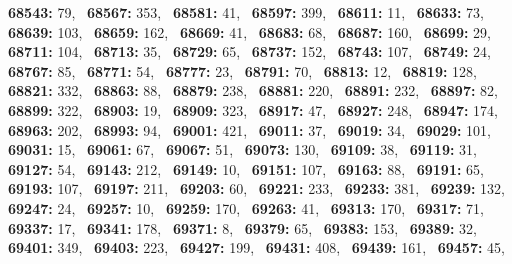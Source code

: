 \textbf{68543:} 79,\allowbreak~ 
\textbf{68567:} 353,\allowbreak~ 
\textbf{68581:} 41,\allowbreak~ 
\textbf{68597:} 399,\allowbreak~ 
\textbf{68611:} 11,\allowbreak~ 
\textbf{68633:} 73,\allowbreak~ 
\textbf{68639:} 103,\allowbreak~ 
\textbf{68659:} 162,\allowbreak~ 
\textbf{68669:} 41,\allowbreak~ 
\textbf{68683:} 68,\allowbreak~ 
\textbf{68687:} 160,\allowbreak~ 
\textbf{68699:} 29,\allowbreak~ 
\textbf{68711:} 104,\allowbreak~ 
\textbf{68713:} 35,\allowbreak~ 
\textbf{68729:} 65,\allowbreak~ 
\textbf{68737:} 152,\allowbreak~ 
\textbf{68743:} 107,\allowbreak~ 
\textbf{68749:} 24,\allowbreak~ 
\textbf{68767:} 85,\allowbreak~ 
\textbf{68771:} 54,\allowbreak~ 
\textbf{68777:} 23,\allowbreak~ 
\textbf{68791:} 70,\allowbreak~ 
\textbf{68813:} 12,\allowbreak~ 
\textbf{68819:} 128,\allowbreak~ 
\textbf{68821:} 332,\allowbreak~ 
\textbf{68863:} 88,\allowbreak~ 
\textbf{68879:} 238,\allowbreak~ 
\textbf{68881:} 220,\allowbreak~ 
\textbf{68891:} 232,\allowbreak~ 
\textbf{68897:} 82,\allowbreak~ 
\textbf{68899:} 322,\allowbreak~ 
\textbf{68903:} 19,\allowbreak~ 
\textbf{68909:} 323,\allowbreak~ 
\textbf{68917:} 47,\allowbreak~ 
\textbf{68927:} 248,\allowbreak~ 
\textbf{68947:} 174,\allowbreak~ 
\textbf{68963:} 202,\allowbreak~ 
\textbf{68993:} 94,\allowbreak~ 
\textbf{69001:} 421,\allowbreak~ 
\textbf{69011:} 37,\allowbreak~ 
\textbf{69019:} 34,\allowbreak~ 
\textbf{69029:} 101,\allowbreak~ 
\textbf{69031:} 15,\allowbreak~ 
\textbf{69061:} 67,\allowbreak~ 
\textbf{69067:} 51,\allowbreak~ 
\textbf{69073:} 130,\allowbreak~ 
\textbf{69109:} 38,\allowbreak~ 
\textbf{69119:} 31,\allowbreak~ 
\textbf{69127:} 54,\allowbreak~ 
\textbf{69143:} 212,\allowbreak~ 
\textbf{69149:} 10,\allowbreak~ 
\textbf{69151:} 107,\allowbreak~ 
\textbf{69163:} 88,\allowbreak~ 
\textbf{69191:} 65,\allowbreak~ 
\textbf{69193:} 107,\allowbreak~ 
\textbf{69197:} 211,\allowbreak~ 
\textbf{69203:} 60,\allowbreak~ 
\textbf{69221:} 233,\allowbreak~ 
\textbf{69233:} 381,\allowbreak~ 
\textbf{69239:} 132,\allowbreak~ 
\textbf{69247:} 24,\allowbreak~ 
\textbf{69257:} 10,\allowbreak~ 
\textbf{69259:} 170,\allowbreak~ 
\textbf{69263:} 41,\allowbreak~ 
\textbf{69313:} 170,\allowbreak~ 
\textbf{69317:} 71,\allowbreak~ 
\textbf{69337:} 17,\allowbreak~ 
\textbf{69341:} 178,\allowbreak~ 
\textbf{69371:} 8,\allowbreak~ 
\textbf{69379:} 65,\allowbreak~ 
\textbf{69383:} 153,\allowbreak~ 
\textbf{69389:} 32,\allowbreak~ 
\textbf{69401:} 349,\allowbreak~ 
\textbf{69403:} 223,\allowbreak~ 
\textbf{69427:} 199,\allowbreak~ 
\textbf{69431:} 408,\allowbreak~ 
\textbf{69439:} 161,\allowbreak~ 
\textbf{69457:} 45,\allowbreak~ 
